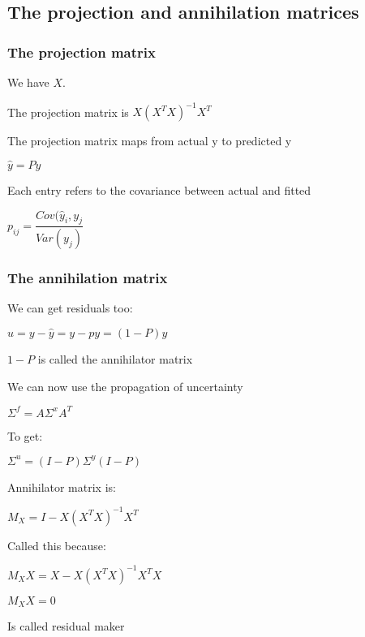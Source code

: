 
\subsection{The projection and annihilation matrices}

\subsubsection{The projection matrix}

We have \(X\).

The projection matrix is \(X(X^TX)^{-1}X^T\)

The projection matrix maps from actual y to predicted y

\(\hat y = Py\)

Each entry refers to the covariance between actual and fitted

\(p_{ij}=\dfrac{Cov (\hat y_i, y_j}{Var (y_j)}\)

\subsubsection{The annihilation matrix}

We can get residuals too:

\(u=y-\hat y=y-py=(1-P)y\)

\(1-P\) is called the annihilator matrix

We can now use the propagation of uncertainty

\(\Sigma^f = A\Sigma^x A^T\)

To get:

\(\Sigma^u = (I-P)\Sigma^y (I-P)\)

Annihilator matrix is:

\(M_X=I-X(X^TX)^{-1}X^T\)

Called this because:

\(M_XX=X-X(X^TX)^{-1}X^TX\)

\(M_XX=0\)

Is called residual maker

